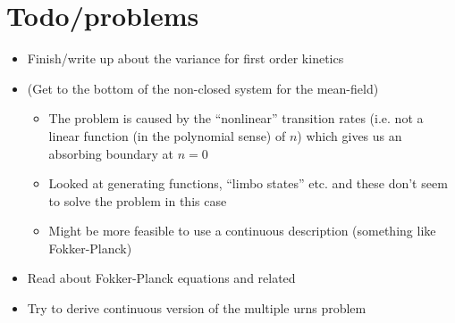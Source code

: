 \documentclass[a4paper,11pt]{article}
\numberwithin{equation}{section}
\begin{document}
\section{Todo/problems}
\begin{itemize}
    \item Finish/write up about the variance for first order kinetics
    \item (Get to the bottom of the non-closed system for the mean-field)
        \begin{itemize}
            \item The problem is caused by the ``nonlinear'' transition rates
                (i.e. not a linear function (in the polynomial sense) of \(n\)) which gives us an
                absorbing boundary at \(n=0\)
            \item Looked at generating functions, ``limbo states'' etc. and
                these don't seem to solve the problem in this case
            \item Might be more feasible to use a continuous description
                (something like Fokker-Planck)
        \end{itemize}
    \item Read about Fokker-Planck equations and related
    \item Try to derive continuous version of the multiple urns problem
\end{itemize}




\end{document}
